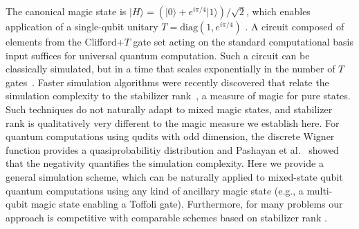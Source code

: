\documentclass[aps,prl,twocolumn,showpacs,superscriptaddress,groupedaddress,amsmath,amssymb]{revtex4-1}  %
\def\ket #1{\vert #1\rangle}
\begin{document}
The canonical magic state is $\ket{H}=(\ket{0}+e^{i\pi/4}\ket{1})/\sqrt{2}$, which enables application of a single-qubit unitary $T=\mathrm{diag}(1,e^{i\pi/4})$ \cite{bravyi_universal_2005,knill_quantum_2005}.  A circuit composed of elements from the Clifford+$T$ gate set acting on the standard computational basis input suffices for universal quantum computation.  Such a circuit can be classically simulated, but in a time that scales exponentially in the number of $T$ gates~\cite{aaronson_improved_2004}.  Faster simulation algorithms were recently discovered that relate the simulation complexity to the stabilizer rank~\cite{bravyi_improved_2016,bravyi_trading_2016,garcia_geometry_2014}, a measure of magic for pure states. Such techniques do not naturally adapt to mixed magic states, and stabilizer rank is qualitatively very different to the magic measure we establish here.  For quantum computations using qudits with odd dimension, the discrete Wigner function provides a quasiprobabilitiy distribution and Pashayan et al.~\cite{pashayan_estimating_2015} showed that the negativity quantifies the simulation complexity.  Here we provide a general simulation scheme, which can be naturally applied to mixed-state qubit quantum computations using any kind of ancillary magic state (e.g., a multi-qubit magic state enabling a Toffoli gate). Furthermore, for many problems our approach is competitive with comparable schemes based on stabilizer rank \cite{bravyi_improved_2016,bravyi_trading_2016}. 

\end{document}
